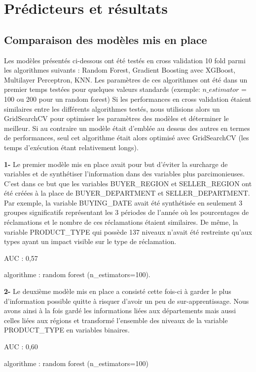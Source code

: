 
\chapter{Prédicteurs et résultats}

\section{Comparaison des modèles mis en place}

Les modèles présentés ci-dessous ont été testés en cross validation 10 fold parmi les algorithmes suivants : 
Random Forest, Gradient Boosting avec XGBoost, Multilayer Perceptron, KNN.
Les paramètres de ces algorithmes ont été dans un premier temps testées pour quelques valeurs standards (exemple:
$n\_estimator$ = 100 ou 200 pour un random forest)
Si les performances en cross validation étaient similaires entre les différents algorithmes
testés, nous utilisions alors un GridSearchCV pour optimiser les paramètres des modèles et
déterminer le meilleur. 
Si au contraire un modèle était d'emblée au dessus des autres en termes de performances, 
seul cet algorithme était alors optimisé avec GridSearchCV (les temps d'exécution étant
relativement longs).

\textbf{1-} Le premier modèle mis en place avait pour but d'éviter la surcharge de variables et de 
synthétiser l'information dans des variables plus parcimonieuses. C'est dans ce but que les 
variables BUYER_REGION et SELLER_REGION ont été créées à la place de BUYER_DEPARTMENT et
SELLER_DEPARTMENT. Par exemple, la variable BUYING_DATE avait été synthétisée en seulement
3 groupes significatifs représentant les 3 périodes de l'année où les pourcentages de 
réclamations et le nombre de ces réclamations étaient similaires. De même, la variable
PRODUCT_TYPE qui possède 137 niveaux n'avait été restreinte qu'aux types ayant un impact visible
sur le type de réclamation. 

AUC : 0,57

algorithme : random forest (n_estimators=100).

\textbf{2-} Le deuxième modèle mis en place a consisté cette fois-ci à garder le plus d'information
possible quitte à risquer d'avoir un peu de sur-apprentissage. Nous avons ainsi à la fois 
gardé les informations liées aux départements mais aussi celles liées aux régions et 
transformé l'ensemble des niveaux de la variable PRODUCT_TYPE en variables binaires.

AUC : 0,60

algorithme : random forest (n_estimators=100)

